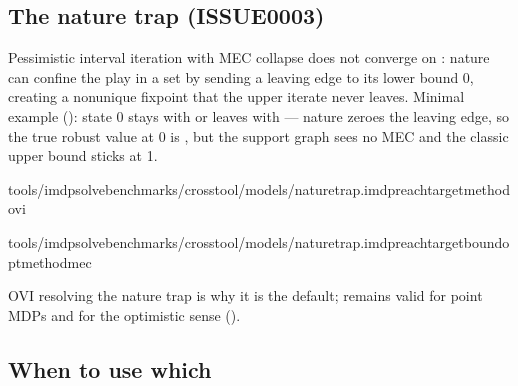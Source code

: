 \documentclass[a4paper,10pt,english]{sphinxmanual}
\begin{document}
\subsection{The nature trap (ISSUE\sphinxhyphen{}0003)}
\label{\detokenize{manual/engines:the-nature-trap-issue-0003}}
\sphinxAtStartPar
Pessimistic interval iteration with  MEC collapse does not converge on
: nature can confine the play in a set by sending
a leaving edge to its lower bound 0, creating a non\sphinxhyphen{}unique fixpoint that the upper
iterate never leaves. Minimal example ():
state 0 stays with \sphinxcode{\sphinxupquote{{[}0.5, 1.0{]}}} or leaves with \sphinxcode{\sphinxupquote{{[}0.0, 0.5{]}}} — nature zeroes the
leaving edge, so the true robust value at 0 is , but the support graph sees no
MEC and the classic upper bound sticks at 1.

\begin{sphinxVerbatim}[commandchars=\\\{\}]
tools/imdp\PYGZus{}solvebenchmarks/crosstool/models/naturetrap.imdpreachtarget\PYGZhy{}\PYGZhy{}methodovi

tools/imdp\PYGZus{}solvebenchmarks/crosstool/models/naturetrap.imdpreachtarget\PYGZhy{}\PYGZhy{}boundopt\PYGZhy{}\PYGZhy{}methodmec
\end{sphinxVerbatim}

\sphinxAtStartPar
OVI resolving the nature trap is why it is the default;  remains valid
for point MDPs and for the optimistic sense ().


\subsection{When to use which}
\label{\detokenize{manual/engines:when-to-use-which}}
\end{document}
